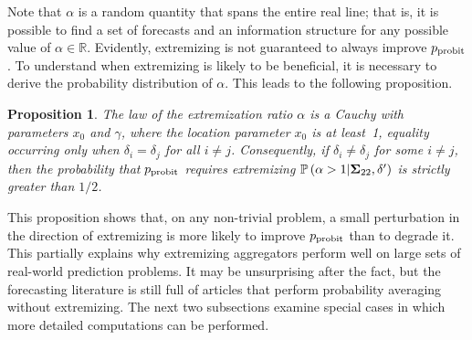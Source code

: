 \documentclass[12pt]{article}
\renewcommand{\P}{\mathbb{P}}
\newtheorem{proposition}[theorem]{Proposition}
\theoremstyle{definition}
\theoremstyle{definition}
\def\P{{\mathbb P}}
\def\probit{p_{\rm probit}}
\begin{document}
Note that $\alpha$ is a random quantity that spans the entire real line;
that is, it is possible to find a set of forecasts and an information structure for any possible value of $\alpha \in
\mathbb{R}$.  Evidently, extremizing is not guaranteed to always
improve $\probit$.  To understand when extremizing is
likely to be beneficial, it is necessary to derive the probability
distribution of $\alpha$. This leads to the following proposition.  

\begin{proposition}
\label{positiveProbThm}
The law of the extremization ratio $\alpha$ is a Cauchy with
parameters $x_0$ and $\gamma$, where the location parameter $x_0$ is
at least~1, equality occurring only when $\delta_i = \delta_j$ for all
$i \neq j$. Consequently, if $\delta_i \neq \delta_j$ for some
$i \neq j$, then the probability that $\probit$
requires extremizing $\P\left(\alpha > 1 | {\bf\Sigma}_{22}, \delta'\right)$
is strictly greater than $1/2$.
\end{proposition}
\noindent
This proposition shows that, on any non-trivial problem, a small
perturbation in the direction of extremizing is more likely to improve
$\probit$ than to degrade it.  This partially explains
why extremizing aggregators perform well on large sets of real-world
prediction problems.  It may be unsurprising after the fact, but the
forecasting literature is still full of articles that perform
probability averaging without extremizing. The next two subsections examine special cases in which more detailed computations can be performed.

\end{document}
